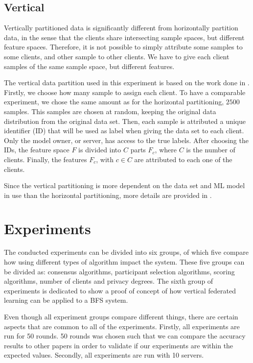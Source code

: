 \subsection{Vertical}\label{subsection:verticalpartitioning}

Vertically partitioned data is significantly different from horizontally partition data, in the sense that the clients share intersecting sample spaces, but different feature spaces. Therefore, it is not possible to simply attribute some samples to some clients, and other sample to other clients. We have to give each client samples of the same sample space, but different features.

The vertical data partition used in this experiment is based on the work done in \cite{10.48550/arxiv.2104.00489}. Firstly, we choose how many sample to assign each client. To have a comparable experiment, we chose the same amount as for the horizontal partitioning, $2500$ samples. This samples are chosen at random, keeping the original data distribution from the original data set. Then, each sample is attributed a unique identifier (ID) that will be used as label when giving the data set to each client. Only the model owner, or server, has access to the true labels. After choosing the IDs, the feature space $F$ is divided into $C$ parts $F_c$, where $C$ is the number of clients. Finally, the features $F_c$, with $c \in C$ are attributed to each one of the clients.

Since the vertical partitioning is more dependent on the data set and ML model in use than the horizontal partitioning, more details are provided in .

\section{Experiments}\label{meth:experiments}

The conducted experiments can be divided into six groups, of which five compare how using different types of algorithm impact the system. These five groups can be divided as: consensus algorithms, participant selection algorithms, scoring algorithms, number of clients and privacy degrees. The sixth group of experiments is dedicated to show a proof of concept of how vertical federated learning can be applied to a BFS system.

Even though all experiment groups compare different things, there are certain aspects that are common to all of the experiments. Firstly, all experiments are run for 50 rounds. 50 rounds was chosen such that we can compare the accuracy results to other papers in order to validate if our experiments are within the expected values. Secondly, all experiments are run with 10 servers.

